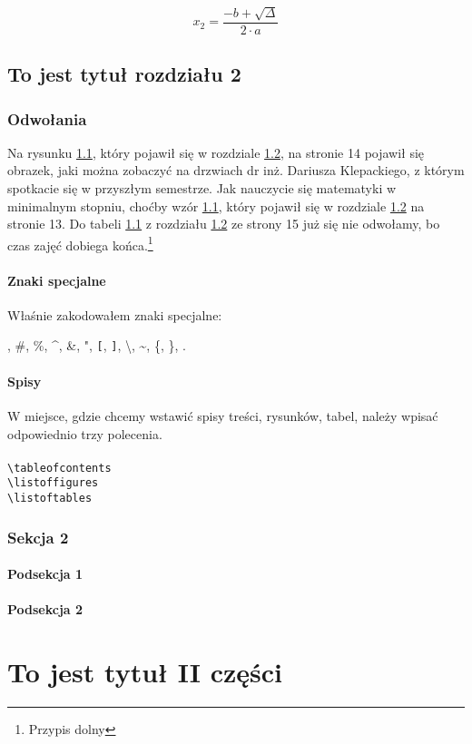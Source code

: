 \documentclass[a4paper, 12pt]{book}
\begin{document}
\begin{equation}
x_2 = \frac{-b+\sqrt{\Delta}}{2\cdot a}
\end{equation}
\clearpage

\chapter{To jest tytuł rozdziału 2}
\section{Odwołania}
Na rysunku \hyperref[rys:da]{1.1}, który pojawił się w rozdziale \hyperref[pismo]{1.2}, na stronie 14 pojawił się obrazek, jaki można zobaczyć na drzwiach dr inż. Dariusza Klepackiego, z którym spotkacie się w przyszłym semestrze. Jak nauczycie się matematyki w minimalnym stopniu, choćby wzór \hyperref[formula]{1.1}, który pojawił się w rozdziale \hyperref[pismo]{1.2} na stronie 13. Do tabeli \hyperref[tab:da]{1.1} z rozdziału \hyperref[pismo]{1.2} ze strony 15 już się nie odwołamy, bo czas zajęć dobiega końca.\footnote{Przypis dolny}
\subsection{Znaki specjalne}
Właśnie zakodowałem znaki specjalne:

\textdollar, \#, \%, \^{}, \&, ", \verb|[|, \verb|]|, \textbackslash, \~{}, \{, \}, \vert.
\subsection{Spisy}
W miejsce, gdzie chcemy wstawić spisy treści, rysunków, tabel, należy wpisać odpowiednio trzy polecenia.\\
\\
\verb|\tableofcontents|\\
\verb|\listoffigures|\\
\verb|\listoftables|
\clearpage
\section{Sekcja 2}
\subsection{Podsekcja 1}
\subsection{Podsekcja 2}
\part{To jest tytuł II części}
\end{document}
